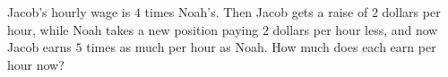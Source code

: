 Jacob's hourly wage is $4$ times Noah's. Then Jacob gets a raise of $2$ dollars per hour, while Noah takes a new position paying $2$ dollars per hour less, and now Jacob earns $5$ times as much per hour as Noah. How much does each earn per hour now?
